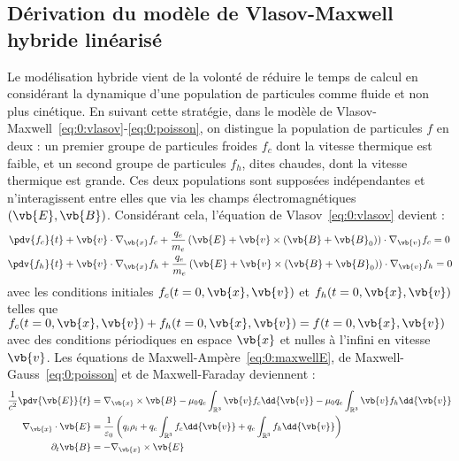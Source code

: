 \subsection{Dérivation du modèle de Vlasov-Maxwell hybride linéarisé}

Le modélisation hybride vient de la volonté de réduire le temps de calcul en considérant la dynamique d'une population de particules comme fluide et non plus cinétique. En suivant cette stratégie, dans le modèle de Vlasov-Maxwell~\eqref{eq:0:vlasov}-\eqref{eq:0:poisson}, on distingue la population de particules $f$ en deux : un premier groupe de particules froides $f_c$ dont la vitesse thermique est faible, et un second groupe de particules $f_h$, dites chaudes, dont la vitesse thermique est grande. Ces deux populations sont supposées indépendantes et n’interagissent entre elles que via les champs électromagnétiques $(\vb{E},\vb{B})$. Considérant cela, l'équation de Vlasov~\eqref{eq:0:vlasov} devient :
$$
  \begin{aligned}
    \pdv{f_c}{t} &+ \vb{v}\cdot\nabla_{\vb{x}} f_c + \frac{q_e}{m_e}\left( \vb{E} + \vb{v}\times(\vb{B}+\vb{B}_0) \right)\cdot\nabla_{\vb{v}} f_c = 0 \\
    \pdv{f_h}{t} &+ \vb{v}\cdot\nabla_{\vb{x}} f_h + \frac{q_e}{m_e}\left( \vb{E} + \vb{v}\times(\vb{B}+\vb{B}_0) \right)\cdot\nabla_{\vb{v}} f_h = 0
  \end{aligned}
$$
avec les conditions initiales $f_c(t=0,\vb{x},\vb{v})$ et $f_h(t=0,\vb{x},\vb{v})$ telles que $f_c(t=0,\vb{x},\vb{v})+f_h(t=0,\vb{x},\vb{v}) = f(t=0,\vb{x},\vb{v})$ avec des conditions périodiques en espace $\vb{x}$ et nulles à l'infini en vitesse $\vb{v}$. Les équations de Maxwell-Ampère~\eqref{eq:0:maxwellE}, de Maxwell-Gauss~\eqref{eq:0:poisson} et de Maxwell-Faraday deviennent :
$$
  \begin{aligned}
    \frac{1}{c^2}\pdv{\vb{E}}{t} &= \nabla_{\vb{x}}\times \vb{B} - \mu_0 q_e\int_{\mathbb{R}^3} \vb{v} f_c\dd{\vb{v}} - \mu_0 q_e\int_{\mathbb{R}^3} \vb{v} f_h\dd{\vb{v}} \\
    \nabla_{\vb{x}}\cdot\vb{E} &= \frac{1}{\varepsilon_0}\left( q_i\rho_i + q_e\int_{\mathbb{R}^3} f_c\dd{\vb{v}} + q_e\int_{\mathbb{R}^3} f_h\dd{\vb{v}} \right) \\
    \partial_t \vb{B} &= -\nabla_{\vb{x}}\times\vb{E}
  \end{aligned}
$$

